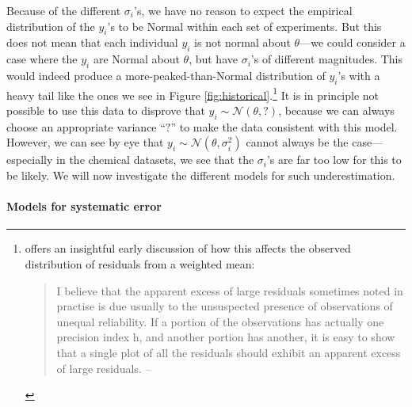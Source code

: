 \documentclass[letterpaper,12pt]{article}
\begin{document}
Because of the different $\sigma_i$'s, we have no reason to expect the empirical distribution of the $y_i$'s to be Normal within each set of experiments. But this does not mean that each individual $y_i$ is not normal about $\theta$---we could consider a case where the $y_i$ are Normal about $\theta$, but have $\sigma_i$'s of different magnitudes. This would indeed produce a more-peaked-than-Normal distribution of $y_i$'s with a heavy tail like the ones we see in Figure \ref{fig:historical}.\footnote{
\citet{birge1932calculation} offers an insightful early discussion of how this affects the observed distribution of residuals from a weighted mean:
\begin{quote}
I believe that the apparent excess of large residuals sometimes noted in practise is due usually to the unsuspected presence of observations of unequal reliability. If a portion of the observations has actually one precision index h, and another portion has another, it is easy to show that a single plot of all the residuals should exhibit an apparent excess of large residuals. \hfill --\citet[pg.~213]{birge1932calculation}
\end{quote}
} It is in principle not possible to use this data to disprove that $y_i\sim\mathcal{N}(\theta,?)$, because we can always choose an appropriate variance ``$?$'' to make the data consistent with this model. However, we can see by eye that $y_i\sim\mathcal{N}(\theta,\sigma_i^2)$ cannot always be the case---especially in the chemical datasets, we see that the $\sigma_i$'s are far too low for this to be likely. We will now investigate the different models for such underestimation.

\paragraph{Models for systematic error} 
\end{document}
